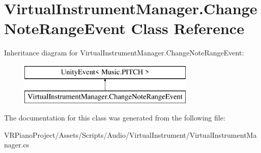 \hypertarget{class_virtual_instrument_manager_1_1_change_note_range_event}{}\section{Virtual\+Instrument\+Manager.\+Change\+Note\+Range\+Event Class Reference}
\label{class_virtual_instrument_manager_1_1_change_note_range_event}
Inheritance diagram for Virtual\+Instrument\+Manager.\+Change\+Note\+Range\+Event\+:\begin{figure}[H]
\begin{center}
\leavevmode
\includegraphics[height=2.000000cm]{class_virtual_instrument_manager_1_1_change_note_range_event}
\end{center}
\end{figure}


The documentation for this class was generated from the following file\+:\begin{DoxyCompactItemize}
\item 
V\+R\+Piano\+Project/\+Assets/\+Scripts/\+Audio/\+Virtual\+Instrument/Virtual\+Instrument\+Manager.\+cs\end{DoxyCompactItemize}
